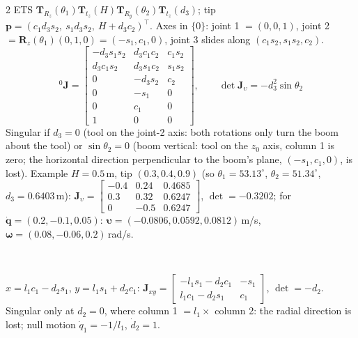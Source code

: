 \begin{multicols}{2}
ETS $\mathbf T_{R_z}(\theta_1)\mathbf T_{t_z}(H)\mathbf T_{R_y}(\theta_2)\mathbf T_{t_z}(d_3)$; tip $\mathbf p=(c_1d_3s_2,\ s_1d_3s_2,\ H+d_3c_2)^\top$. Axes in $\{0\}$: joint 1 $=(0,0,1)$, joint 2 $=\mathbf R_z(\theta_1)(0,1,0)=(-s_1,c_1,0)$, joint 3 slides along $(c_1s_2,s_1s_2,c_2)$.
\[{}^0\mathbf J=\begin{bmatrix}-d_3s_1s_2&d_3c_1c_2&c_1s_2\\d_3c_1s_2&d_3s_1c_2&s_1s_2\\0&-d_3s_2&c_2\\0&-s_1&0\\0&c_1&0\\1&0&0\end{bmatrix},\qquad\det\mathbf J_\upsilon=-d_3^2\sin\theta_2\]
Singular if $d_3=0$ (tool on the joint-2 axis: both rotations only turn the boom about the tool) or $\sin\theta_2=0$ (boom vertical: tool on the $z_0$ axis, column 1 is zero; the horizontal direction perpendicular to the boom's plane, $(-s_1,c_1,0)$, is lost). Example $H=0.5$\,m, tip $(0.3,0.4,0.9)$ (so $\theta_1=53.13^\circ$, $\theta_2=51.34^\circ$, $d_3=0.6403$\,m): $\mathbf J_\upsilon=\begin{bmatrix}-0.4&0.24&0.4685\\0.3&0.32&0.6247\\0&-0.5&0.6247\end{bmatrix}$, $\det=-0.3202$; for $\dot{\mathbf q}=(0.2,-0.1,0.05)$: $\boldsymbol\upsilon=(-0.0806,0.0592,0.0812)$\,m/s, $\boldsymbol\omega=(0.08,-0.06,0.2)$\,rad/s. \chk
\begin{center}
\\
\end{center}
$x=l_1c_1-d_2s_1$, $y=l_1s_1+d_2c_1$: $\mathbf J_{xy}=\begin{bmatrix}-l_1s_1-d_2c_1&-s_1\\l_1c_1-d_2s_1&c_1\end{bmatrix}$, $\det=-d_2$. Singular only at $d_2=0$, where column 1 $=l_1\times$ column 2: the radial direction is lost; null motion $\dot q_1=-1/l_1$, $\dot d_2=1$. \chk


\end{multicols}
